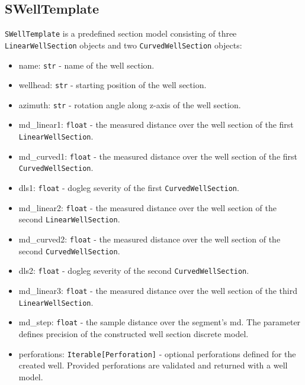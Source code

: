 \documentclass[english,10pt,a4paper]{article}
\begin{document}
\subsection{SWellTemplate}
\texttt{SWellTemplate} is a predefined section model consisting of three \texttt{LinearWellSection} objects and two \texttt{CurvedWellSection} objects:
\begin{itemize}
	\item  \colorbox{gray!20}{name:} \texttt{str} - name of the well section.
	\item  \colorbox{gray!20}{wellhead:} \texttt{str} - starting position of the well section.
	\item  \colorbox{gray!20}{azimuth:} \texttt{str} - rotation angle along z-axis of the well section.
	\item  \colorbox{gray!20}{md\_linear1:} \texttt{float} - the measured distance over the well section of the first \texttt{LinearWellSection}.
	\item  \colorbox{gray!20}{md\_curved1:} \texttt{float} - the measured distance over the well section of the first \texttt{CurvedWellSection}.
	\item  \colorbox{gray!20}{dls1:} \texttt{float} - dogleg severity of the first \texttt{CurvedWellSection}.
	\item  \colorbox{gray!20}{md\_linear2:} \texttt{float} - the measured distance over the well section of the second \texttt{LinearWellSection}.
	\item  \colorbox{gray!20}{md\_curved2:} \texttt{float} - the measured distance over the well section of the second \texttt{CurvedWellSection}.
	\item  \colorbox{gray!20}{dls2:} \texttt{float} - dogleg severity of the second \texttt{CurvedWellSection}.
	\item  \colorbox{gray!20}{md\_linear3:} \texttt{float} - the measured distance over the well section of the third \texttt{LinearWellSection}.
	\item  \colorbox{gray!20}{md\_step:} \texttt{float} - the sample distance over the segment's md. The parameter defines precision of the constructed well section discrete model.
	\item  \colorbox{gray!20}{perforations:} \texttt{Iterable[Perforation]} - optional perforations defined for the created well. Provided perforations are validated and returned with a well model.
\end{itemize}
\end{document}
